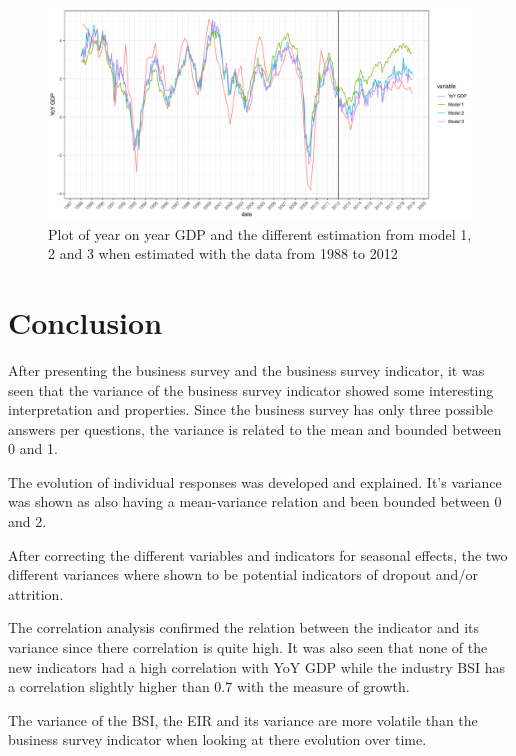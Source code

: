 \documentclass[12pt,a4paper,oneside]{book}
\begin{document}
\begin{figure}[H]
    \centering
    \includegraphics[scale=0.5]{Graphs/predictions3.pdf}
    \caption{Plot of year on year GDP and the different estimation from model 1, 2 and 3 when estimated with the data from 1988 to 2012}
    \label{fig:predictions3}
\end{figure}




\chapter{Conclusion}

After presenting the business survey and the business survey indicator, it was seen that the variance of the business survey indicator showed some interesting interpretation and properties. 
Since the business survey has only three possible answers per questions, the variance is related to the mean and bounded between 0 and 1.

The evolution of individual responses was developed and explained.
It's variance was shown as also having a mean-variance relation and been bounded between 0 and 2.

After correcting the different variables and indicators for seasonal effects, the two different variances where shown to be potential indicators of dropout and/or attrition.

The correlation analysis confirmed the relation between the indicator and its variance since there correlation is quite high. 
It was also seen that none of the new indicators had a high correlation with YoY GDP while the industry BSI has a correlation slightly higher than 0.7 with the measure of growth.

The variance of the BSI, the EIR and its variance are more volatile than the business survey indicator when looking at there evolution over time.
\end{document}
